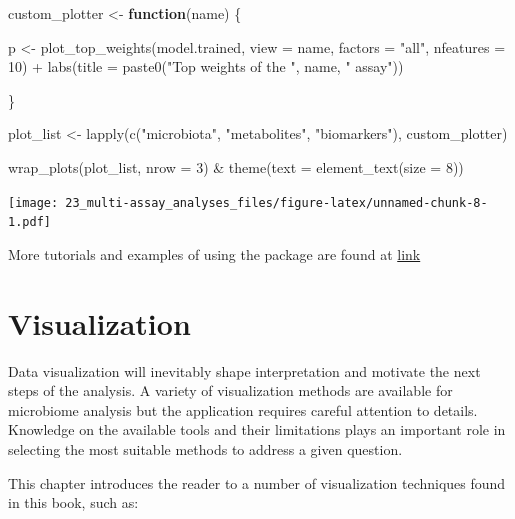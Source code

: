 \documentclass[
]{book}
\newenvironment{Shaded}{\begin{snugshade}}{\end{snugshade}}
\newcommand{\AttributeTok}[1]{\textcolor[rgb]{0.77,0.63,0.00}{#1}}
\newcommand{\ControlFlowTok}[1]{\textcolor[rgb]{0.13,0.29,0.53}{\textbf{#1}}}
\newcommand{\DecValTok}[1]{\textcolor[rgb]{0.00,0.00,0.81}{#1}}
\newcommand{\FunctionTok}[1]{\textcolor[rgb]{0.00,0.00,0.00}{#1}}
\newcommand{\NormalTok}[1]{#1}
\newcommand{\OtherTok}[1]{\textcolor[rgb]{0.56,0.35,0.01}{#1}}
\newcommand{\SpecialCharTok}[1]{\textcolor[rgb]{0.00,0.00,0.00}{#1}}
\newcommand{\StringTok}[1]{\textcolor[rgb]{0.31,0.60,0.02}{#1}}
\begin{document}
\begin{Shaded}
\begin{Highlighting}[]
\NormalTok{custom\_plotter }\OtherTok{\textless{}{-}} \ControlFlowTok{function}\NormalTok{(name) \{}
  
\NormalTok{  p }\OtherTok{\textless{}{-}} \FunctionTok{plot\_top\_weights}\NormalTok{(model.trained,}
                        \AttributeTok{view =}\NormalTok{ name,}
                        \AttributeTok{factors =} \StringTok{"all"}\NormalTok{,}
                        \AttributeTok{nfeatures =} \DecValTok{10}\NormalTok{) }\SpecialCharTok{+}
    \FunctionTok{labs}\NormalTok{(}\AttributeTok{title =} \FunctionTok{paste0}\NormalTok{(}\StringTok{"Top weights of the "}\NormalTok{, name, }\StringTok{" assay"}\NormalTok{))}
  
\NormalTok{\}}

\NormalTok{plot\_list }\OtherTok{\textless{}{-}} \FunctionTok{lapply}\NormalTok{(}\FunctionTok{c}\NormalTok{(}\StringTok{"microbiota"}\NormalTok{, }\StringTok{"metabolites"}\NormalTok{, }\StringTok{"biomarkers"}\NormalTok{), custom\_plotter)}

\FunctionTok{wrap\_plots}\NormalTok{(plot\_list, }\AttributeTok{nrow =} \DecValTok{3}\NormalTok{) }\SpecialCharTok{\&} \FunctionTok{theme}\NormalTok{(}\AttributeTok{text =} \FunctionTok{element\_text}\NormalTok{(}\AttributeTok{size =} \DecValTok{8}\NormalTok{))}
\end{Highlighting}
\end{Shaded}

\texttt{[image: 23\_multi-assay\_analyses\_files/figure-latex/unnamed-chunk-8-1.pdf]}

More tutorials and examples of using the package are found at \href{https://biofam.github.io/MOFA2/tutorials.html}{link}

\hypertarget{viz-chapter}{%
\chapter{Visualization}\label{viz-chapter}}

Data visualization will inevitably shape interpretation and motivate
the next steps of the analysis. A variety of visualization methods are
available for microbiome analysis but the application requires careful
attention to details. Knowledge on the available tools and their
limitations plays an important role in selecting the most suitable
methods to address a given question.

This chapter introduces the reader to a number of visualization
techniques found in this book, such as:
\end{document}
